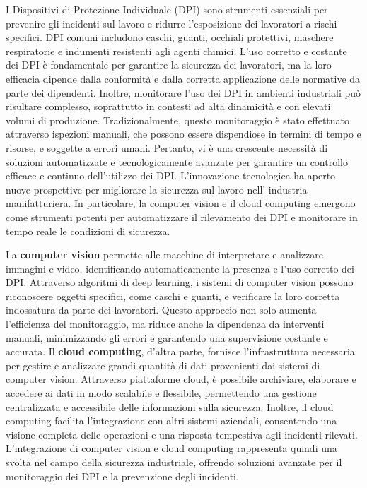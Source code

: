 I Dispositivi di Protezione Individuale (DPI) sono strumenti essenziali per prevenire gli incidenti sul lavoro e ridurre l'esposizione dei lavoratori a rischi specifici. DPI comuni includono caschi, guanti, occhiali protettivi, maschere respiratorie e indumenti resistenti agli agenti chimici. L'uso corretto e costante dei DPI è fondamentale per garantire la sicurezza dei lavoratori, ma la loro efficacia dipende dalla conformità e dalla corretta applicazione delle normative da parte dei dipendenti. Inoltre, monitorare l'uso dei DPI in ambienti industriali può risultare complesso, soprattutto in contesti ad alta dinamicità e con elevati volumi di produzione. Tradizionalmente, questo monitoraggio è stato effettuato attraverso ispezioni manuali, che possono essere dispendiose in termini di tempo e risorse, e soggette a errori umani. Pertanto, vi è una crescente necessità di soluzioni automatizzate e tecnologicamente avanzate per garantire un controllo efficace e continuo dell'utilizzo dei DPI. L'innovazione tecnologica ha aperto nuove prospettive per migliorare la sicurezza sul lavoro nell' industria manifatturiera. In particolare, la computer vision e il cloud computing emergono come strumenti potenti per automatizzare il rilevamento dei DPI e monitorare in tempo reale le condizioni di sicurezza.

La {\bfseries computer vision} permette alle macchine di interpretare e analizzare immagini e video, identificando automaticamente la presenza e l'uso corretto dei DPI. Attraverso algoritmi di deep learning, i sistemi di computer vision possono riconoscere oggetti specifici, come caschi e guanti, e verificare la loro corretta indossatura da parte dei lavoratori. Questo approccio non solo aumenta l'efficienza del monitoraggio, ma riduce anche la dipendenza da interventi manuali, minimizzando gli errori e garantendo una supervisione costante e accurata. Il {\bfseries cloud computing}, d'altra parte, fornisce l'infrastruttura necessaria per gestire e analizzare grandi quantità di dati provenienti dai sistemi di computer vision. Attraverso piattaforme cloud, è possibile archiviare, elaborare e accedere ai dati in modo scalabile e flessibile, permettendo una gestione centralizzata e accessibile delle informazioni sulla sicurezza. Inoltre, il cloud computing facilita l'integrazione con altri sistemi aziendali, consentendo una visione completa delle operazioni e una risposta tempestiva agli incidenti rilevati. L'integrazione di computer vision e cloud computing rappresenta quindi una svolta nel campo della sicurezza industriale, offrendo soluzioni avanzate per il monitoraggio dei DPI e la prevenzione degli incidenti. 

